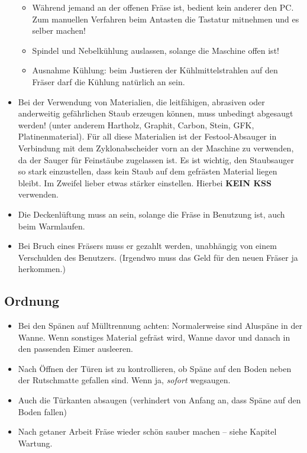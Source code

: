 \documentclass{\basedir/fablab-document}
\begin{document}
\begin{itemize}
\begin{itemize}
	\item Während jemand an der offenen Fräse ist, bedient kein anderer den PC. Zum manuellen Verfahren beim Antasten die Tastatur mitnehmen und es selber machen!
	\item Spindel und Nebelkühlung auslassen, solange die Maschine offen ist!
	\item Ausnahme Kühlung: beim Justieren der Kühlmittelstrahlen auf den Fräser darf die Kühlung natürlich an sein.
\end{itemize}
	\item Bei der Verwendung von Materialien, die leitfähigen, abrasiven oder anderweitig gefährlichen Staub erzeugen können, muss unbedingt abgesaugt werden! (unter anderem Hartholz, Graphit, Carbon, Stein, GFK, Platinenmaterial). Für all diese Materialien ist der Festool-Absauger in Verbindung mit dem Zyklonabscheider vorn an der Maschine zu verwenden, da der Sauger für Feinstäube zugelassen ist. Es ist wichtig, den Staubsauger so stark einzustellen, dass kein Staub auf dem gefrästen Material liegen bleibt. Im Zweifel lieber etwas stärker einstellen. Hierbei \textbf{KEIN KSS} verwenden.
	\item Die Deckenlüftung muss an sein, solange die Fräse in Benutzung ist, auch beim Warmlaufen.
	\item Bei Bruch eines Fräsers muss er gezahlt werden, unabhängig von einem Verschulden des Benutzers. (Irgendwo muss das Geld für den neuen Fräser ja herkommen.)
\end{itemize}
\subsection{Ordnung} \label{ordnung}
\begin{itemize}
	\item Bei den Spänen auf Mülltrennung achten: Normalerweise sind Aluspäne in der Wanne. Wenn sonstiges Material gefräst wird, Wanne davor und danach in den passenden Eimer ausleeren.
	\item Nach Öffnen der Türen ist zu kontrollieren, ob Späne auf den Boden neben der Rutschmatte gefallen sind. Wenn ja, \emph{sofort} wegsaugen.
	\item Auch die Türkanten absaugen (verhindert von Anfang an, dass Späne auf den Boden fallen)
	\item Nach getaner Arbeit Fräse wieder schön sauber machen -- siehe Kapitel Wartung.
\end{itemize}

\clearpage
\end{document}
